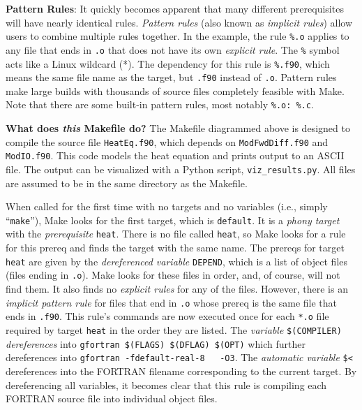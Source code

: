\documentclass[12pt, letterpaper]{article}
\begin{document}
\noindent \textbf{Pattern Rules}: It quickly becomes apparent that many 
different prerequisites will have nearly identical
rules.  \emph{Pattern rules} (also known as \emph{implicit rules})
 allow users to combine multiple rules together.
In the example, the rule \verb|%.o| applies to any file that ends in {\tt .o}
that does not have its own \emph{explicit rule}.  
The {\tt\%} symbol acts like a Linux wildcard (*).  The dependency for
this rule is \verb|%.f90|, which means the same file name as the target, but
{\tt .f90} instead of {\tt .o}.  Pattern rules make large builds with
thousands of source files completely feasible with Make.  Note that there
are some built-in pattern rules, most notably \verb|%.o: %.c|.

\vspace{0.5cm}

\noindent \textbf{What does \emph{this} Makefile do?}  The Makefile diagrammed
above
is designed to compile the source file {\tt HeatEq.f90}, which depends on 
{\tt ModFwdDiff.f90} and {\tt ModIO.f90}.  This code models the heat
equation and prints output to an ASCII file.  The output can be visualized
with a Python script, {\tt viz\_results.py}.  All files are assumed to
be in the same directory as the Makefile.

 When called for the first time with no
targets and no variables (i.e., simply ``{\tt make}''), Make looks for the
first target, which is {\tt default}.  It is a \emph{phony target} with
the \emph{prerequisite} {\tt heat}.  There is no file called {\tt heat}, so Make
looks for a rule for this prereq and finds the target with the same name.
The prereqs for target {\tt heat} are given by the \emph{dereferenced variable}
{\tt DEPEND}, which is a list of object files (files ending in {\tt .o}).
Make looks for these files in order, and, of course, will not find them.  It
also finds no \emph{explicit rules} for any of the files.  However, there is
an \emph{implicit pattern rule} for files that end in \verb|.o| whose prereq
is the same file that ends in \verb|.f90|.  This rule's commands are now
executed once for each \verb|*.o| file required by target {\tt heat} in the
order they are listed.
 The \emph{variable} \verb|$(COMPILER)| \emph{dereferences} into 
\verb|gfortran $(FLAGS) $(DFLAG) $(OPT)| which further dereferences into
\verb|gfortran -fdefault-real-8   -O3|.  The \emph{automatic variable}
\verb|$<| dereferences into the FORTRAN filename corresponding to the current
target.  By dereferencing all variables, it becomes clear that this rule is 
compiling each FORTRAN source file into individual object files.
\end{document}
